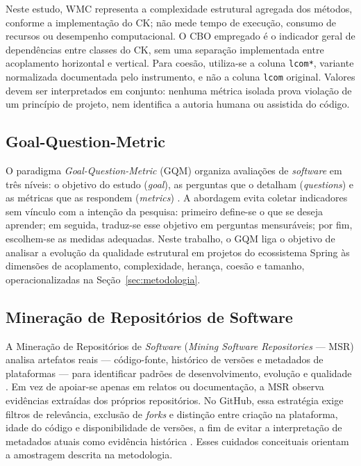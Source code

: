 Neste estudo, WMC representa a complexidade estrutural agregada dos métodos, conforme a implementação do CK; não mede tempo de execução, consumo de recursos ou desempenho computacional. O CBO empregado é o indicador geral de dependências entre classes do CK, sem uma separação implementada entre acoplamento horizontal e vertical. Para coesão, utiliza-se a coluna \texttt{lcom*}, variante normalizada documentada pelo instrumento, e não a coluna \texttt{lcom} original. Valores devem ser interpretados em conjunto: nenhuma métrica isolada prova violação de um princípio de projeto, nem identifica a autoria humana ou assistida do código.

\subsection{Goal-Question-Metric}
\label{subsec:fund-gqm}

O paradigma \emph{Goal-Question-Metric} (GQM) organiza avaliações de \emph{software} em três níveis: o objetivo do estudo (\emph{goal}), as perguntas que o detalham (\emph{questions}) e as métricas que as respondem (\emph{metrics}) \cite{basili:94}. A abordagem evita coletar indicadores sem vínculo com a intenção da pesquisa: primeiro define-se o que se deseja aprender; em seguida, traduz-se esse objetivo em perguntas mensuráveis; por fim, escolhem-se as medidas adequadas. Neste trabalho, o GQM liga o objetivo de analisar a evolução da qualidade estrutural em projetos do ecossistema Spring às dimensões de acoplamento, complexidade, herança, coesão e tamanho, operacionalizadas na Seção~\ref{sec:metodologia}.

\subsection{Mineração de Repositórios de Software}
\label{subsec:fund-msr}

A Mineração de Repositórios de \emph{Software} (\emph{Mining Software Repositories} --- MSR) analisa artefatos reais --- código-fonte, histórico de versões e metadados de plataformas --- para identificar padrões de desenvolvimento, evolução e qualidade \cite{hassan:08}. Em vez de apoiar-se apenas em relatos ou documentação, a MSR observa evidências extraídas dos próprios repositórios. No GitHub, essa estratégia exige filtros de relevância, exclusão de \emph{forks} e distinção entre criação na plataforma, idade do código e disponibilidade de versões, a fim de evitar a interpretação de metadados atuais como evidência histórica \cite{kalliamvakou:14,kalliamvakou:16}. Esses cuidados conceituais orientam a amostragem descrita na metodologia.

